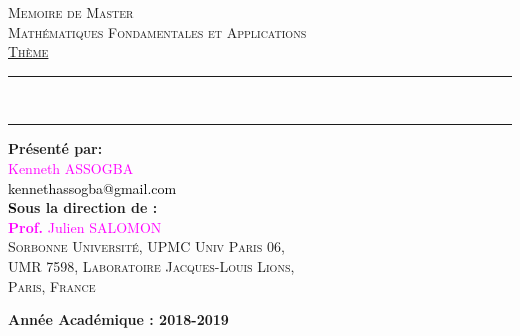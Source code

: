 \begin{titlepage}
\begin{center}

\begin{center}
\textsc{Memoire de Master}\\
\vspace{0.5cm}
\textsc{Math\'ematiques Fondamentales et Applications}\\
\vspace{1.2cm}
\textsc{\underline{Thème}}\\
\vspace{0.8cm}
\end{center}

\rule{\linewidth}{1mm}\\
\begin{center}
\textsc{\textbf{ \color{blue}{Schémas monotones discrets pour l'équation de Schrödinger}}}
\end{center}
\rule{\linewidth}{1mm}
\vspace{1cm}
\begin{flushright}
\textbf{Présenté par:}\\
\vspace{0.2cm}
\textcolor{magenta}{Kenneth ASSOGBA}\\
\textcolor{black}{kennethassogba@gmail.com}\\
\vspace{1cm}
\textbf{\textcolor{black}Sous la direction de :}\\
\vspace{0.2cm}
\textcolor{magenta}{\textbf{Prof.} Julien SALOMON}\\
\textsc{Sorbonne Université, UPMC Univ Paris 06,\\
	UMR 7598, Laboratoire Jacques-Louis Lions,\\
	Paris, France}\\
\vspace{0.2cm}
\end{flushright}
\vspace{2cm}
\vspace{4cm}
\begin{center}
\noindent \textbf{Année Acad\'emique : 2018-2019}
\end{center}
\end{center}
\end{titlepage}